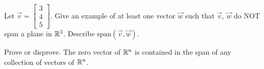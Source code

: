 \documentclass{ximera}
\begin{document}
\begin{problem}
\begin{selectAll}
\end{selectAll}
\end{problem}

\begin{problem}\label{prob:notinspan}
Let $\vec{v}=\begin{bmatrix}3\\4\\5\end{bmatrix}$.  Give an example of at least one vector $\vec{w}$ such that $\vec{v}$, $\vec{w}$ do NOT span a plane in $\mathbb{R}^3$.  Describe $\mbox{span}(\vec{v}, \vec{w})$.
\end{problem}

\begin{problem}\label{prob:zeroinspan}
Prove or disprove.  The zero vector of $\mathbb{R}^n$ is contained in the span of any collection of vectors of $\mathbb{R}^n$.
\end{problem}
\end{document}
